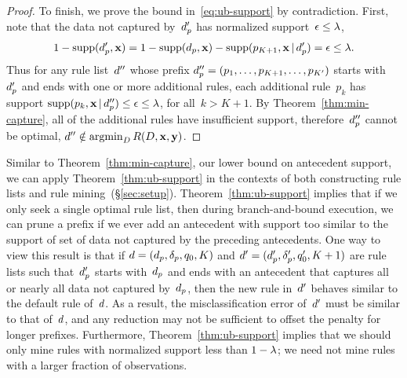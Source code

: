 \begin{arxiv}
\begin{proof}
To finish, we prove the bound in~\eqref{eq:ub-support} by contradiction.
%
First, note that the data not captured by~$d_p'$
has normalized support~${\epsilon \le {\lambda}}$, \ie
\begin{align}
1 - \textnormal{supp}(d_p', \mathbf{x}) = 1 - \textnormal{supp}(d_p, \mathbf{x}) - \textnormal{supp}(p_{K+1}, \mathbf{x} \,|\, d_p') = \epsilon \le {\lambda}.
\end{align}
Thus for any rule list~${d}''$ whose prefix
$d_p'' = (p_1, \dots, p_{K+1}, \dots, p_{K'})$ starts
with~$d_p'$ and ends with one or more additional rules,
each additional rule~$p_k$ has support
${\textnormal{supp}(p_k, \mathbf{x} \,|\, d_p'') \le \epsilon \le {\lambda}}$,
for all~${k > K+1}$.
%
By Theorem~\ref{thm:min-capture},
all of the additional rules have insufficient support,
therefore~$d_p''$ cannot be optimal,
\ie ${{d}'' \notin \operatorname*{argmin}_{{D}} R({D}, \mathbf{x}, \mathbf{y})}$.
\end{proof}

Similar to Theorem~\ref{thm:min-capture}, our lower bound on
antecedent support, we can apply Theorem~\ref{thm:ub-support}
in the contexts of both constructing rule lists and
rule mining~(\S\ref{sec:setup}).
%
Theorem~\ref{thm:ub-support} implies that if we only seek a single
optimal rule list, then during branch-and-bound execution,
we can prune a prefix if we ever add an antecedent with support
too similar to the support of set of data not captured by the
preceding antecedents.
%
One way to view this result is that if
${{d} = (d_p, \delta_p, q_0, K)}$
and ${{d}' = (d_p', \delta_p', q_0', K + 1)}$
are rule lists such that~$d_p'$ starts with~$d_p$
and ends with an antecedent that captures all or nearly all
data not captured by~$d_p$, then the new rule in~${d}'$
behaves similar to the default rule of~${d}$.
%
As a result, the misclassification error of~${d}'$ must be
similar to that of~${d}$, and any reduction may not be
sufficient to offset the penalty for longer prefixes.
%
Furthermore, Theorem~\ref{thm:ub-support} implies that we should
only mine rules with normalized support less than ${1 - {\lambda}}$;
we need not mine rules with a larger fraction of observations.
\end{arxiv}

